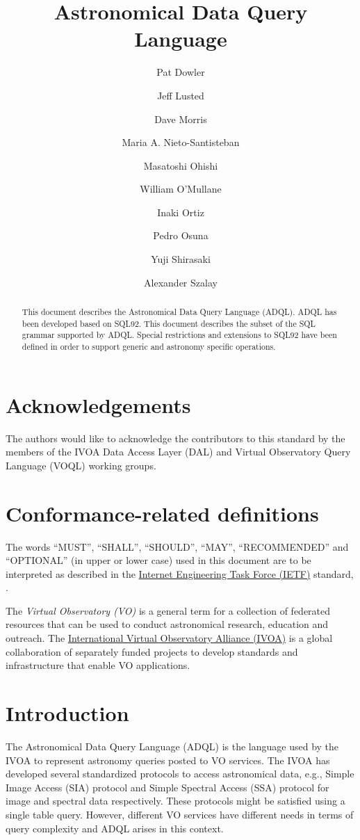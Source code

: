 \documentclass[11pt,a4paper]{ivoa}
\title{Astronomical Data Query Language}
\author{Pat Dowler}
\author{Jeff Lusted}
\author{Dave Morris}
\author{Maria A. Nieto-Santisteban}
\author{Masatoshi Ohishi}
\author{William O’Mullane}
\author{Inaki Ortiz}
\author{Pedro Osuna}
\author{Yuji Shirasaki}
\author{Alexander Szalay}
\begin{document}
\begin{abstract}
This document describes the Astronomical Data Query Language (ADQL).
ADQL has been developed based on SQL92.
This document describes the subset of the SQL grammar supported by ADQL.
Special restrictions and extensions to SQL92 have been defined in order
to support generic and astronomy specific operations.
\end{abstract}

\section*{Acknowledgements}

The authors would like to acknowledge the contributors to this standard by
the members of the IVOA Data Access Layer (DAL) and Virtual Observatory
Query Language (VOQL) working groups.

\section*{Conformance-related definitions}

The words ``MUST'', ``SHALL'', ``SHOULD'', ``MAY'', ``RECOMMENDED'' and
``OPTIONAL'' (in upper or lower case) used in this document are to be
interpreted as described in the
\href{https://www.ietf.org/}{Internet Engineering Task Force (IETF)}
standard, \citet{std:RFC2119}.

The \emph{Virtual Observatory (VO)} is a general term for a collection of
federated resources that can be used to conduct astronomical research,
education and outreach. The
\href{http://www.ivoa.net}{International Virtual Observatory Alliance (IVOA)}
is a global collaboration of separately funded
projects to develop standards and infrastructure that enable VO applications.

\clearpage
\section{Introduction}
\label{sec:introduction}

The Astronomical Data Query Language (ADQL) is the language used by the
IVOA to represent astronomy queries posted to VO services.
The IVOA has developed several standardized protocols to access astronomical
data, e.g., Simple Image Access (SIA) protocol and Simple Spectral Access (SSA)
protocol for image and spectral data respectively.
These protocols might be satisfied using a single
table query. However, different VO services have different needs in terms
of query complexity and ADQL arises in this context.
\end{document}
